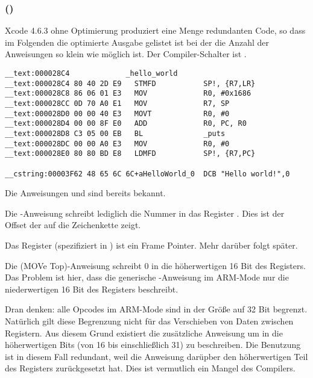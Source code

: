 \subsubsection{\OptimizingXcodeIV (\ARMMode)}

Xcode 4.6.3 ohne Optimierung produziert eine Menge redundanten Code, so dass im Folgenden die
optimierte Ausgabe gelistet ist bei der die Anzahl der Anweisungen so klein wie möglich ist.
Der Compiler-Schalter ist \Othree.

\begin{lstlisting}[caption=\OptimizingXcodeIV (\ARMMode),style=customasmARM]
__text:000028C4             _hello_world
__text:000028C4 80 40 2D E9   STMFD           SP!, {R7,LR}
__text:000028C8 86 06 01 E3   MOV             R0, #0x1686
__text:000028CC 0D 70 A0 E1   MOV             R7, SP
__text:000028D0 00 00 40 E3   MOVT            R0, #0
__text:000028D4 00 00 8F E0   ADD             R0, PC, R0
__text:000028D8 C3 05 00 EB   BL              _puts
__text:000028DC 00 00 A0 E3   MOV             R0, #0
__text:000028E0 80 80 BD E8   LDMFD           SP!, {R7,PC}

__cstring:00003F62 48 65 6C 6C+aHelloWorld_0  DCB "Hello world!",0
\end{lstlisting}

Die Anweisungen  und  sind bereits bekannt.


Die \MOV-Anweisung schreibt lediglich die Nummer  in das Register .
Dies ist der Offset der auf die Zeichenkette  zeigt.

Das Register  (spezifiziert in \IOSABI) ist ein Frame Pointer. Mehr darüber folgt später.

Die  (MOVe Top)-Anweisung schreibt 0 in die höherwertigen 16 Bit des Registers.
Das Problem ist hier, dass die generische \MOV-Anweisung im ARM-Mode nur die niederwertigen 16 Bit
des Registers beschreibt.

Dran denken: alle Opcodes im ARM-Mode sind in der Größe auf 32 Bit begrenzt. Natürlich gilt diese
Begrenzung nicht für das Verschieben von Daten zwischen Registern.
Aus diesem Grund existiert die zusätzliche Anweisung   um in die höherwertigen Bits
(von 16 bis einschließlich 31) zu beschreiben.
Die Benutzung ist in diesem Fall redundant, weil die Anweisung  darüpber
den höherwertigen Teil des Registers zurückgesetzt hat.
Dies ist vermutlich ein Mangel des Compilers.

